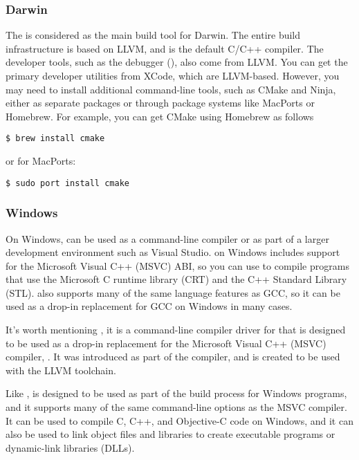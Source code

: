 \subsubsection{Darwin}
The \clang is considered as the main build tool for Darwin. The entire
build infrastructure is based on LLVM, and \clang is the default C/C++
compiler. The developer tools, such as the debugger (\lldb), also come from
LLVM. You can get the primary developer utilities from XCode, which are
LLVM-based. However, you may need to install additional command-line tools, such
as CMake and Ninja, either as separate packages or through package systems like
MacPorts or Homebrew. For example, you can get CMake using Homebrew as
follows  
\begin{adjustwidth}{0em}{0em}
\begin{verbatim}
$ brew install cmake
\end{verbatim}
\end{adjustwidth}
or for MacPorts:
\begin{adjustwidth}{0em}{0em}
\begin{verbatim}
$ sudo port install cmake
\end{verbatim}
\end{adjustwidth}

\subsubsection{Windows}
On Windows, \clang can be used as a command-line compiler or as part of a larger
development environment such as Visual Studio. \clang on Windows includes support
for the Microsoft Visual C++ (MSVC) ABI, so you can use \clang to compile
programs that use the Microsoft C runtime library (CRT) and the C++ Standard
Library (STL). \clang also supports many of the same language features as GCC,
so  it can be used as a drop-in replacement for GCC on Windows in many cases. 

It's worth mentioning \citep{llvm:clangcl}, it is a
command-line compiler driver for \clang that is designed to be used as a drop-in
replacement for the Microsoft Visual C++ (MSVC) compiler, . It
was introduced as part of the \clang compiler, and is created to be used with the
LLVM toolchain. 

Like ,  is designed to be used as part of the
build process for Windows programs, and it supports many of the same
command-line options as the MSVC compiler. It can be used to compile C, C++, and
Objective-C code on Windows, and it can also be used to link object files and
libraries to create executable programs or dynamic-link libraries (DLLs). 

